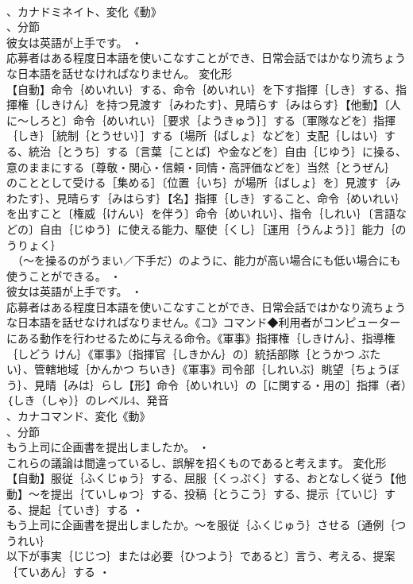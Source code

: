 \documentclass[8pt]{extreport}
\begin{document}
\begin{CJK}{UTF8}{min}
\\	、カナドミネイト、変化《動》
\\	、分節
\\	彼女は英語が上手です。 ・
\\	応募者はある程度日本語を使いこなすことができ、日常会話ではかなり流ちょうな日本語を話せなければなりません。	変化形 
\\	【自動】命令｛めいれい｝する、命令｛めいれい｝を下す指揮｛しき｝する、指揮権｛しきけん｝を持つ見渡す｛みわたす｝、見晴らす｛みはらす｝【他動】〔人に～しろと〕命令｛めいれい｝［要求｛ようきゅう｝］する〔軍隊などを〕指揮｛しき｝［統制｛とうせい｝］する〔場所｛ばしょ｝などを〕支配｛しはい｝する、統治｛とうち｝する〔言葉｛ことば｝や金などを〕自由｛じゆう｝に操る、意のままにする〔尊敬・関心・信頼・同情・高評価などを〕当然｛とうぜん｝のこととして受ける［集める］〔位置｛いち｝が場所｛ばしょ｝を〕見渡す｛みわたす｝、見晴らす｛みはらす｝【名】指揮｛しき｝すること、命令｛めいれい｝を出すこと〔権威｛けんい｝を伴う〕命令｛めいれい｝、指令｛しれい｝〔言語などの〕自由｛じゆう｝に使える能力、駆使｛くし｝［運用｛うんよう｝］能力｛のうりょく｝
\\	~（～を操るのがうまい／下手だ）のように、能力が高い場合にも低い場合にも使うことができる。 ・
\\	彼女は英語が上手です。 ・
\\	応募者はある程度日本語を使いこなすことができ、日常会話ではかなり流ちょうな日本語を話せなければなりません。《コ》コマンド◆利用者がコンピューターにある動作を行わせるために与える命令。《軍事》指揮権｛しきけん｝、指導権｛しどう けん｝《軍事》〔指揮官｛しきかん｝の〕統括部隊｛とうかつ ぶたい｝、管轄地域｛かんかつ ちいき｝《軍事》司令部｛しれいぶ｝眺望｛ちょうぼう｝、見晴｛みは｝らし【形】命令｛めいれい｝の［に関する・用の］指揮（者）｛しき（しゃ）｝のレベル4、発音
\\	、カナコマンド、変化《動》
\\	、分節
\\	もう上司に企画書を提出しましたか。 ・
\\	これらの議論は間違っているし、誤解を招くものであると考えます。	変化形 
\\	【自動】服従｛ふくじゅう｝する、屈服｛くっぷく｝する、おとなしく従う【他動】～を提出｛ていしゅつ｝する、投稿｛とうこう｝する、提示｛ていじ｝する、提起｛ていき｝する ・
\\	もう上司に企画書を提出しましたか。～を服従｛ふくじゅう｝させる〔通例｛つうれい｝
\\	以下が事実｛じじつ｝または必要｛ひつよう｝であると〕言う、考える、提案｛ていあん｝する ・

\end{CJK}
\end{document}
